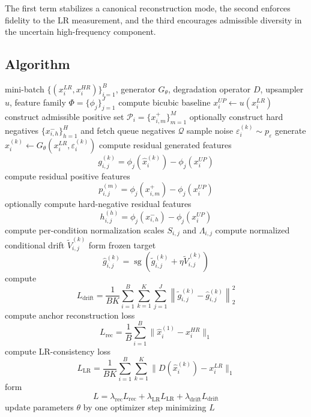 \documentclass{article}
\begin{document}
The first term stabilizes a canonical reconstruction mode, the second enforces fidelity to the LR measurement, and the third encourages admissible diversity in the uncertain high-frequency component.

\subsection{Algorithm}

\begin{algorithm}[t]
\caption{Training step of conditional generative drifting for one-step super-resolution}
\label{alg:cgd_sr_train}
\begin{algorithmic}[1]
\Require mini-batch $\{(x_i^{LR},x_i^{HR})\}_{i=1}^{B}$, generator $G_{\theta}$, degradation operator $D$, upsampler $u$, feature family $\Phi=\{\phi_j\}_{j=1}^{J}$
    \State compute bicubic baseline $x_i^{UP}\gets u(x_i^{LR})$
    \State construct admissible positive set $\mathcal{P}_i=\{x_{i,m}^{+}\}_{m=1}^{M}$
    \State optionally construct hard negatives $\{x_{i,h}^{-}\}_{h=1}^{H}$ and fetch queue negatives $\mathcal{Q}$
        \State sample noise $\varepsilon_i^{(k)}\sim p_{\varepsilon}$
        \State generate $\hat{x}_i^{(k)} \gets G_{\theta}(x_i^{LR},\varepsilon_i^{(k)})$
    \EndFor
\EndFor
{}
    \State compute residual generated features
    \[
    g_{i,j}^{(k)}=\phi_j(\hat{x}_i^{(k)})-\phi_j(x_i^{UP})
    \]
    \State compute residual positive features
    \[
    p_{i,j}^{(m)}=\phi_j(x_{i,m}^{+})-\phi_j(x_i^{UP})
    \]
    \State optionally compute hard-negative residual features
    \[
    h_{i,j}^{(h)}=\phi_j(x_{i,h}^{-})-\phi_j(x_i^{UP})
    \]
    \State compute per-condition normalization scales $S_{i,j}$ and $\Lambda_{i,j}$
    \State compute normalized conditional drift $\tilde V_{i,j}^{(k)}$
    \State form frozen target
    \[
    \hat g_{i,j}^{(k)}=
    \operatorname{sg}\!\left(\tilde g_{i,j}^{(k)}+\eta \tilde V_{i,j}^{(k)}\right)
    \]
\EndFor
\State compute
\[
L_{\mathrm{drift}}
=
\frac{1}{BK}
\sum_{i=1}^{B}\sum_{k=1}^{K}\sum_{j=1}^{J}
\left\|
\tilde g_{i,j}^{(k)}-\hat g_{i,j}^{(k)}
\right\|_2^2
\]
\State compute anchor reconstruction loss
\[
L_{\mathrm{rec}}
=
\frac{1}{B}\sum_{i=1}^{B}
\|\hat{x}_i^{(1)}-x_i^{HR}\|_1
\]
\State compute LR-consistency loss
\[
L_{\mathrm{LR}}
=
\frac{1}{BK}\sum_{i=1}^{B}\sum_{k=1}^{K}
\|D(\hat{x}_i^{(k)})-x_i^{LR}\|_1
\]
\State form
\[
L=
\lambda_{\mathrm{rec}}L_{\mathrm{rec}}
+
\lambda_{\mathrm{LR}}L_{\mathrm{LR}}
+
\lambda_{\mathrm{drift}}L_{\mathrm{drift}}
\]
\State update parameters $\theta$ by one optimizer step minimizing \(L\)
\end{algorithmic}
\end{algorithm}
\end{document}
